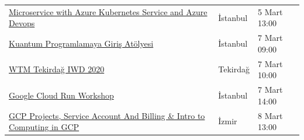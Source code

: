 \documentclass[11pt]{article}
\begin{document}
\begin{longtable}{|p{8cm}|l|l|}
\href{https://www.meetup.com/Microsoft-Giri\%25C5\%259Fimcilik-Bulu\%25C5\%259Fmalar\%25C4\%25B1/events/268504717/}{Microservice with Azure Kubernetes Service and Azure Devops} & İstanbul & 5 Mart 13:00\\
\href{https://www.meetup.com/QWomen-\%25C4\%25B0stanbul/events/268233749/}{Kuantum Programlamaya Giriş Atölyesi} & İstanbul & 7 Mart 09:00\\
\href{https://www.meetup.com/gdgtekirdag/events/268421016/}{WTM Tekirdağ IWD 2020} & Tekirdağ & 7 Mart 10:00\\
\href{https://www.meetup.com/GDG-Cloud-Istanbul/events/268749560/}{Google Cloud Run Workshop} & İstanbul & 7 Mart 14:00\\
\href{https://www.meetup.com/GDG-Cloud-Izmir/events/268749612/}{GCP Projects, Service Account And Billing \& Intro to Computing in GCP} & İzmir & 8 Mart 13:00\\
\hline
\end{longtable}
\end{document}
